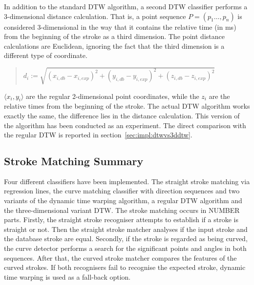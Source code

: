 In addition to the standard DTW algorithm, a second DTW classifier performs 
a 3-dimensional distance calculation.
That is, a point sequence \(P = (p_{1}\ldots,p_{n})\) is considered 
3-dimensional in the way that it contains the relative time (in ms) from the
beginning of the stroke as a third dimension.
The point distance calculations are Euclidean, ignoring the fact that the
third dimension is a different type of coordinate.
\begin{quote}
\(
  d_i := \sqrt{(x_{i,db}-x_{i,exp})^2+(y_{i,db}-y_{i,exp})^2+(z_{i,db}-z_{i,exp})^2} 
\)
\end{quote}
\(\langle x_i, y_i \rangle \) are the regular 2-dimensional point coordinates, 
while the \(z_i\) are the relative times from the beginning of the stroke.
The actual DTW algorithm works exactly the same, the difference lies in 
the distance calculation.
This version of the algorithm has been conducted as an experiment. The direct
comparison with the regular DTW is reported in 
section~\ref{sec:impl:dtwvs3ddtw}.


\subsection{Stroke Matching Summary}
\label{sec:hwre:strokematchingsummary}

Four different classifiers have been implemented.
The straight stroke matching via regression lines,
the curve matching classifier with direction sequences and two variants
of the dynamic time warping algorithm, a regular DTW algorithm and the 
three-dimensional variant DTW.
The stroke matching occurs in NUMBER parts. 
Firstly, the straight stroke recogniser attempts to establish if a stroke 
is straight or not. Then the straight stroke matcher analyses if the input
stroke and the database stroke are equal.
Secondly, if the stroke is regarded as being curved, the curve detector 
performs a search for the significant points and angles in both sequences.
After that, the curved stroke matcher compares the features of the curved
strokes. If both recognisers fail to recognise the expected stroke, 
dynamic time warping is used as a fall-back option.

